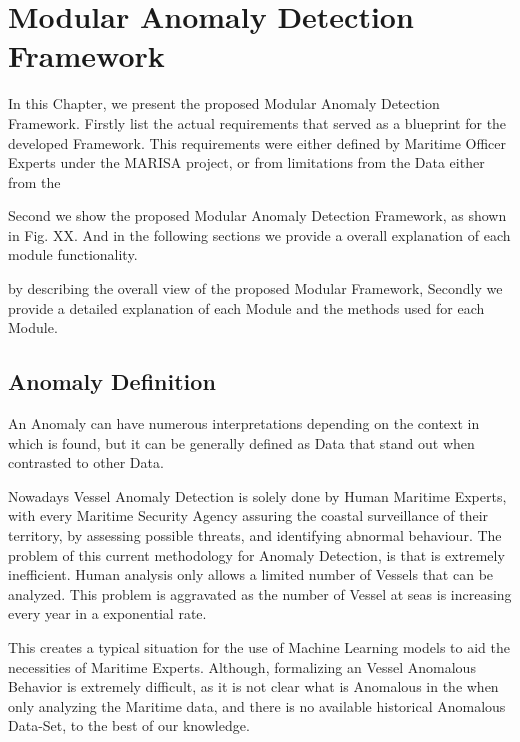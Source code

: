 \chapter{Modular Anomaly Detection Framework}
\label{chapter:Chapter 3}

In this Chapter, we present the proposed Modular Anomaly Detection Framework. Firstly list the actual requirements that served as a blueprint for the developed Framework. This requirements were either defined by Maritime Officer Experts under the MARISA project, or from limitations from the Data either from the  

Second we show the proposed Modular Anomaly Detection Framework, as shown in Fig. XX. And in the following sections we provide a overall explanation of each module functionality. 

by describing the overall view of the proposed Modular Framework, Secondly we provide a detailed explanation of each Module and the methods used for each Module. 


\section{Anomaly Definition}
An Anomaly can have numerous interpretations depending on the context in which is found, but it can be generally defined as Data that stand out when contrasted to other Data.

Nowadays Vessel Anomaly Detection is solely done by Human Maritime Experts, with every Maritime Security Agency assuring the coastal surveillance of their territory, by assessing possible threats, and identifying abnormal behaviour. 
The problem of this current methodology for Anomaly Detection, is that is extremely inefficient. Human analysis only allows a limited number of Vessels that can be analyzed. This problem is aggravated as the number of Vessel at seas is increasing every year in a exponential rate. 

This creates a typical situation for the use of Machine Learning models to aid the necessities of Maritime Experts.
Although, formalizing an Vessel Anomalous Behavior is extremely difficult, as it is not clear what is Anomalous in the when only analyzing the Maritime data, and there is no available historical Anomalous Data-Set, to the best of our knowledge.

